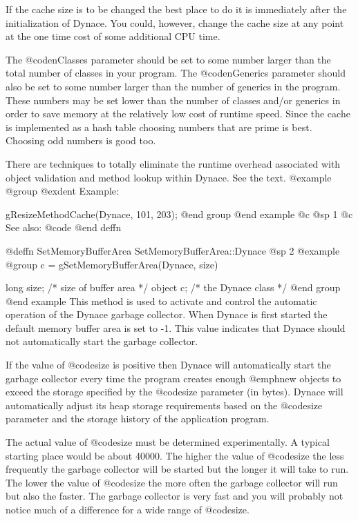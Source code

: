 If the cache size is to be changed the best place to do it is immediately
after the initialization of Dynace.  You could, however, change the cache size
at any point at the one time cost of some additional CPU time.

The @code{nClasses} parameter should be set to some number larger than
the total number of classes in your program.  The @code{nGenerics}
parameter should also be set to some number larger than the number of
generics in the program.  These numbers may be set lower than the
number of classes and/or generics in order to save memory at the
relatively low cost of runtime speed.  Since the cache is implemented
as a hash table choosing numbers that are prime is best.
Choosing odd numbers is good too.

There are techniques to totally eliminate the runtime overhead
associated with object validation and method lookup within Dynace.
See the text.
@example
@group
@exdent Example:

gResizeMethodCache(Dynace, 101, 203);
@end group
@end example
@c @sp 1
@c See also:  @code{}
@end deffn






@deffn {SetMemoryBufferArea} SetMemoryBufferArea::Dynace
@sp 2
@example
@group
c = gSetMemoryBufferArea(Dynace, size)

long    size;   /*  size of buffer area  */
object  c;      /*  the Dynace class  */
@end group
@end example
This method is used to activate and control the automatic operation of the
Dynace garbage collector.  When Dynace is first started the default memory buffer
area is set to -1.  This value indicates that Dynace should not automatically
start the garbage collector.

If the value of @code{size} is positive then Dynace will automatically
start the garbage collector every time the program creates enough
@emph{new} objects to exceed the storage specified by the @code{size}
parameter (in bytes).  Dynace will automatically adjust its heap storage
requirements based on the @code{size} parameter and the storage history
of the application program.

The actual value of @code{size} must be determined experimentally.
A typical starting place would be about 40000.  The higher the value of
@code{size} the less frequently the garbage collector will be started
but the longer it will take to run.  The lower the value of @code{size}
the more often the garbage collector will run but also the faster.
The garbage collector is very fast and you will probably not notice much
of a difference for a wide range of @code{size}.

